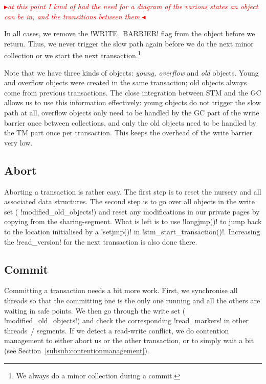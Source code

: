 \documentclass{sigplanconf}
\makeatletter
\renewcommand\lstinline[1][]{%
  \Collectverb{\@@myverb}%
}
\def\@@myverb#1{%
    \begingroup
    \fboxsep=0.2em
    \colorbox{verylightgray}{\oldlstinline|#1|}%
    \endgroup
}
\newcommand{\mynote}[2]{%
  \textcolor{red}{%
    \fbox{\bfseries\sffamily\scriptsize#1}%
    {\small$\blacktriangleright$\textsf{\emph{#2}}$\blacktriangleleft$}%
  }%
}
\newcommand\cfbolz[1]{\mynote{cfbolz}{#1}}
\makeatother
\begin{document}
\cfbolz{at this point I kind of had the need for a diagram of the various
states an object can be in, and the transitions between them.}

In all cases, we remove the \lstinline!WRITE_BARRIER!  flag from the
object before we return. Thus, we never trigger the slow path again
before we do the next minor collection or we start the next
transaction.\footnote{We always do a minor collection during a commit.}

Note that we have three kinds of objects: \emph{young, overflow} and
\emph{old} objects. Young and overflow objects were created in the
same transaction; old objects always come from previous transactions.
The close integration between STM and the GC allows us to use this
information effectively: young objects do not trigger the slow path at
all, overflow objects only need to be handled by the GC part of the
write barrier once between collections, and only the old objects need
to be handled by the TM part once per transaction. This keeps the
overhead of the write barrier very low.


\subsection{Abort}

Aborting a transaction is rather easy. The first step is to reset the
nursery and all associated data structures. The second step is to go
over all objects in the write set (\lstinline!modified_old_objects!)
and reset any modifications in our private pages by copying from the
sharing-segment. What is left is to use \lstinline!longjmp()!  to jump
back to the location initialised by a \lstinline!setjmp()!  in
\lstinline!stm_start_transaction()!.  Increasing the
\lstinline!read_version! for the next transaction is also done there.




\subsection{Commit}

Committing a transaction needs a bit more work. First, we synchronise
all threads so that the committing one is the only one running and all
the others are waiting in safe points. We then go through the write
set (\lstinline!modified_old_objects!)  and check the corresponding
\lstinline!read_markers!  in other threads~/ segments. If we detect a
read-write conflict, we do contention management to either abort us or
the other transaction, or to simply wait a bit (see Section~\ref{subsub:contentionmanagement}).
\end{document}
